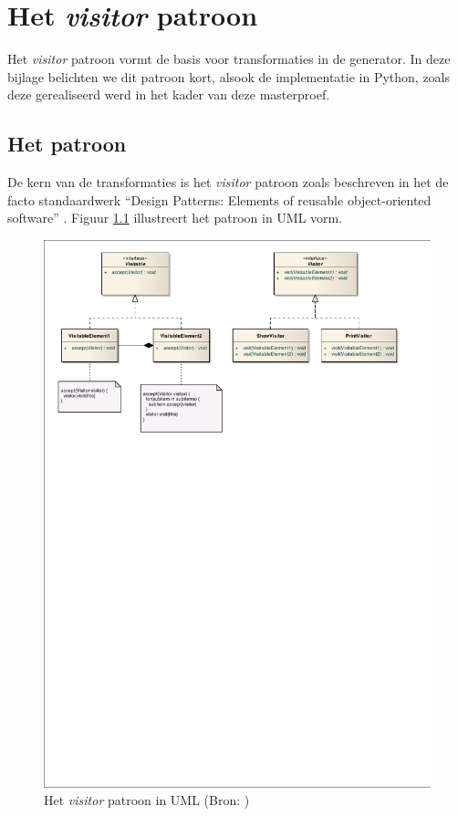 
\chapter{Het \emph{visitor} patroon}
\label{appendix:visitor}

Het \emph{visitor} patroon vormt de basis voor transformaties in de generator.
In deze bijlage belichten we dit patroon kort, alsook de implementatie in
Python, zoals deze gerealiseerd werd in het kader van deze masterproef.

\section{Het patroon}
\label{section:devel-visitor-pattern}

De kern van de transformaties is het \emph{visitor} patroon zoals beschreven in
het de facto standaardwerk ``Design Patterns: Elements of reusable
object-oriented software'' \citep{gamma1994design}. Figuur \ref{fig:visitor}
illustreert het patroon in UML vorm.

\begin{figure}[ht]
  \centering
  \includegraphics[width=0.9\linewidth]{resources/visitor.pdf}
  \caption[Het \emph{visitor} patroon in UML]{Het \emph{visitor} patroon in UML (Bron: \citep{wikipedia:visitor})}
  \label{fig:visitor}
\end{figure}

